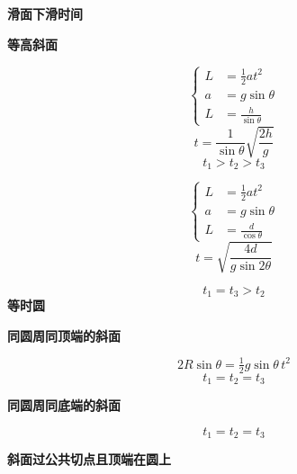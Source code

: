 \textbf{滑面下滑时间} %

\textbf{等高斜面}


\[
\left\{\begin{aligned}
L&=\tfrac{1}{2}at^{2}\\
a&=g\sin\theta\\
L&=\frac{h}{\sin\theta}
\end{aligned}\right.
\]
\[
t=\frac{1}{\sin\theta}\sqrt{\frac{2h}{g}}
\]
\[
t_1>t_2>t_3
\]

\[
\left\{\begin{aligned}
L&=\tfrac{1}{2}at^{2}\\
a&=g\sin\theta\\
L&=\frac{d}{\cos\theta}
\end{aligned}\right.
\]
\[
t=\sqrt{\frac{4d}{g\sin 2\theta}}
\]


\[
t_1=t_3>t_2
\]
\textbf{等时圆}

\textbf{同圆周同顶端的斜面}


\[
2R\sin\theta=\tfrac{1}{2}g\sin\theta\,t^{2}
\]
\[
t_1=t_2=t_3
\]

\textbf{同圆周同底端的斜面}


\[
t_1=t_2=t_3
\]

\textbf{斜面过公共切点且顶端在圆上}


